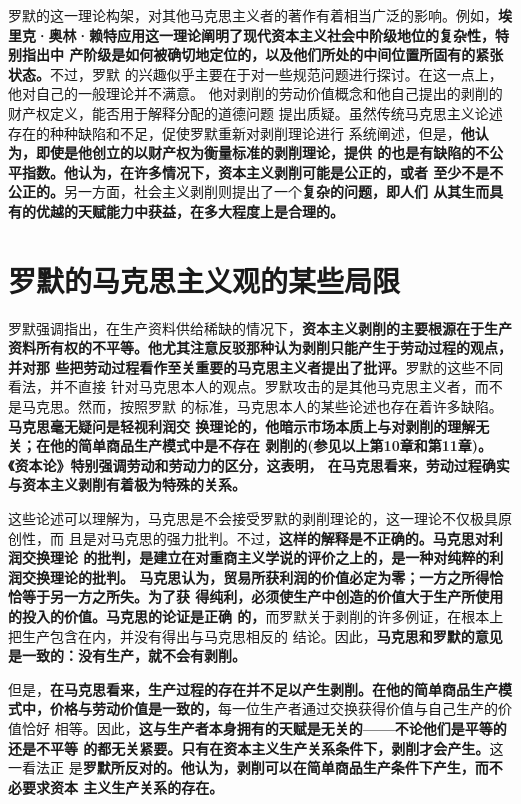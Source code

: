 罗默的这一理论构架，对其他马克思主义者的著作有着相当广泛的影响。例如，\textbf{埃
  里克·奥林·赖特应用这一理论阐明了现代资本主义社会中阶级地位的复杂性，特别指出中
  产阶级是如何被确切地定位的，以及他们所处的中间位置所固有的紧张状态。}不过，罗默
的兴趣似乎主要在于对一些规范问题进行探讨。在这一点上，他对自己的一般理论并不满意。
他对剥削的劳动价值概念和他自己提出的剥削的财产权定义，能否用于解释分配的道德问题
提出质疑。虽然传统马克思主义论述存在的种种缺陷和不足，促使罗默重新对剥削理论进行
系统阐述，但是，\textbf{他认为，即使是他创立的以财产权为衡量标准的剥削理论，提供
  的也是有缺陷的不公平指数。他认为，在许多情况下，资本主义剥削可能是公正的，或者
  至少不是不公正的。}另一方面，社会主义剥削则提出了一个\textbf{复杂的问题，即人们
  从其生而具有的优越的天赋能力中获益，在多大程度上是合理的。}

\section{罗默的马克思主义观的某些局限}

罗默强调指出，在生产资料供给稀缺的情况下，\textbf{资本主义剥削的主要根源在于生产
  资料所有权的不平等。他尤其注意反驳那种认为剥削只能产生于劳动过程的观点，并对那
  些把劳动过程看作至关重要的马克思主义者提出了批评。}罗默的这些不同看法，并不直接
针对马克思本人的观点。罗默攻击的是其他马克思主义者，而不是马克思。然而，按照罗默
的标准，马克思本人的某些论述也存在着许多缺陷。\textbf{马克思毫无疑问是轻视利润交
  换理论的，他暗示市场本质上与对剥削的理解无关；在他的简单商品生产模式中是不存在
  剥削的(参见以上第10章和第11章)。《资本论》特别强调劳动和劳动力的区分，这表明，
  在马克思看来，劳动过程确实与资本主义剥削有着极为特殊的关系。}

这些论述可以理解为，马克思是不会接受罗默的剥削理论的，这一理论不仅极具原创性，而
且是对马克思的强力批判。不过，\textbf{这样的解释是不正确的。马克思对利润交换理论
  的批判，是建立在对重商主义学说的评价之上的，是一种对纯粹的利润交换理论的批判。
  马克思认为，贸易所获利润的价值必定为零；一方之所得恰恰等于另一方之所失。为了获
  得纯利，必须使生产中创造的价值大于生产所使用的投入的价值。马克思的论证是正确
  的，}而罗默关于剥削的许多例证，在根本上把生产包含在内，并没有得出与马克思相反的
结论。因此，\textbf{马克思和罗默的意见是一致的：没有生产，就不会有剥削。}

但是，\textbf{在马克思看来，生产过程的存在并不足以产生剥削。在他的简单商品生产模
  式中，价格与劳动价值是一致的，}每一位生产者通过交换获得价值与自己生产的价值恰好
相等。因此，\textbf{这与生产者本身拥有的天赋是无关的——不论他们是平等的还是不平等
  的都无关紧要。只有在资本主义生产关系条件下，剥削才会产生。}这一看法正
是\textbf{罗默所反对的。他认为，剥削可以在简单商品生产条件下产生，而不必要求资本
  主义生产关系的存在。}

